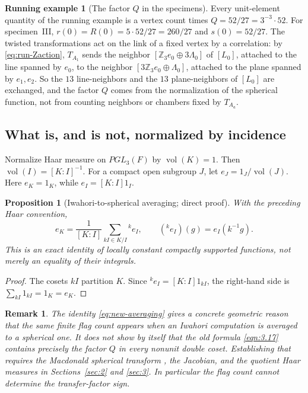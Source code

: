 \documentclass[12pt,letterpaper]{amsart}
\numberwithin{equation}{section}
\newtheorem{proposition}[theorem]{Proposition}
\newtheorem{remark}{Remark}
\theoremstyle{definition}
\newtheorem{runex}[theorem]{Running example}
\theoremstyle{plain}
\begin{document}
\begin{runex}[The factor $Q$ in the specimens]
\label{run:flags}
Every unit-element quantity of the running example is a vertex count
times $Q=52/27=3^{-3}\cdot52$. For specimen~III,
$r(0)=R(0)=5\cdot52/27=260/27$ and $s(0)=52/27$. The twisted
transformations act on the link of a fixed vertex by a correlation:
by \eqref{eq:run-Zaction}, $T_{A_1}$ sends the neighbor
$[\mathbb Z_3e_0\oplus3\Lambda_0]$ of $[L_0]$, attached to the line
spanned by $e_0$, to the neighbor $[3\mathbb Z_3e_0\oplus\Lambda_0]$,
attached to the plane spanned by $e_1,e_2$. So the $13$ line-neighbors
and the $13$ plane-neighbors of $[L_0]$ are exchanged, and the factor
$Q$ comes from the normalization of the spherical function, not from
counting neighbors or chambers fixed by $T_{A_a}$.
\end{runex}

\subsection{What is, and is not, normalized by incidence}
Normalize Haar measure on $PGL_3(F)$ by
$\operatorname{vol}(K)=1$. Then
$\operatorname{vol}(I)=[K:I]^{-1}$.
For a compact open subgroup $J$, let $e_J=1_J/\operatorname{vol}(J)$.
Here $e_K=1_K$, while $e_I=[K:I]1_I$.

\begin{proposition}[Iwahori-to-spherical averaging; direct proof]
\label{prop:new-averaging}
With the preceding Haar convention,
\begin{equation}\label{eq:new-averaging}
 e_K=\frac1{[K:I]}\sum_{kI\in K/I}{}^k e_I,
 \qquad ({}^k e_I)(g)=e_I(k^{-1}g).
\end{equation}
This is an exact identity of locally constant compactly supported
functions, not merely an equality of their integrals.
\end{proposition}
\begin{proof}
The cosets $kI$ partition $K$. Since
${}^k e_I=[K:I]1_{kI}$, the right-hand side is
$\sum_{kI}1_{kI}=1_K=e_K$.
\end{proof}

\begin{remark}
The identity \eqref{eq:new-averaging} gives a concrete geometric
reason that the same finite flag count appears when an Iwahori
computation is averaged to a spherical one. It does \emph{not}
show by itself that the old formula \eqref{eqn:3.17} contains
precisely the factor $Q$ in every nonunit double coset. Establishing
that requires the Macdonald spherical transform \cite{Ma71}, the
Jacobian, and the quotient Haar measures in Sections~\ref{sec:2}
and \ref{sec:3}. In particular the flag count cannot determine the
transfer-factor sign.
\end{remark}
\end{document}

